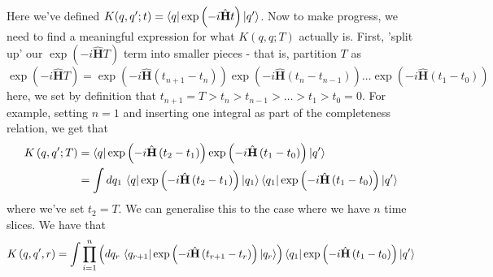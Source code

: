 \documentclass[11pt, oneside]{article}   	%
\theoremstyle{slanted}
\renewcommand{\op}[1]{\hat{\mathbf{#1}}}
\begin{document}
Here we've defined $ K ( q , q '; t )  = \bra{q}\exp\left(  - i \op{H } t  \right) \ket{ q ' } $. 
Now to make progress, we need to find
a meaningful expression for what $ K \left( q, q ; T \right)  $ 
actually is. First, 'split up' 
our $ \exp (  - i \op{H } T)$ term into smaller pieces - 
that is, partition $ T $ as 
\begin{equation}
	\exp\left(  - i \op{H } T  \right)  = 
	\exp \left(  - i \op{H } \left( t_{ n + 1 }  - t _ n  \right)   \right) \exp \left(  - i \op{H } \left( t_n  - t_{ n - 1 }  \right)   \right)  \dots \exp\left(  - i \op{H } \left( t _ 1  - t _ 0  \right)   \right)  
\end{equation} here, we set by definition that 
$ t_{ n + 1 }  =T  > t _ n > t _{ n - 1 } > \dots > t _ 1 > t _ 0 = 0 $. For example, setting $ n = 1$ and inserting one 
integral as part of the completeness relation, 
we get that 
\begin{align*}
	K \left( q, q' ; T  \right)  &=  
	\bra{ q }\exp\left(  - i \op{H } \left( t_2 - t_1  \right)  \right) \exp\left(  - i \op{ H } \left( t_1  - t_0   \right)   \right) \ket{q ' }  \\
	&=  \int d q_1 \,  
	\bra{ q } \exp\left(  - i \op{H } \left( t_2  - t_1  \right) \right)\ket{q_1 } \bra{q_1 } \exp\left( - i \op{H } \left( t_1  - t_0  \right)   \right)\ket{q ' } 
\end{align*}
where we've set $ t_2 = T $. We can generalise this 
to the case where we have $ n $ time slices. We 
have that 
\begin{equation}
	K\left( q, q' , r  \right)   = 
	\int \prod_{ i = 1 } ^ n \left( d q _  r \, 
	\bra{q _{ r +  1} } \exp \left(  - i \op{ H } 
\left(  t _{ r + 1 }  - t _ r  \right)  \right) \ket{q _ r }\right)\bra{q _  1}\exp\left(  - i \op{H } \left( t_1 - t_0  \right)   \right) \ket{q ' } 
\end{equation}
\end{document}
